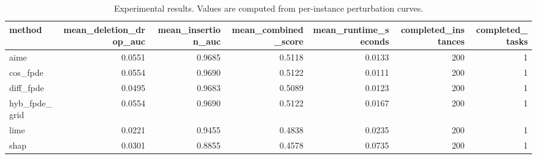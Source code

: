 \begin{table}[t]
\caption{Experimental results. Values are computed from per-instance perturbation curves.}
\label{tab:main_results_computed}
\centering
\begin{tabular}{lrrrrrr}
\toprule
method & mean\_deletion\_drop\_auc & mean\_insertion\_auc & mean\_combined\_score & mean\_runtime\_seconds & completed\_instances & completed\_tasks \\
\midrule
aime & 0.0551 & 0.9685 & 0.5118 & 0.0133 & 200 & 1 \\
cos\_fpde & 0.0554 & 0.9690 & 0.5122 & 0.0111 & 200 & 1 \\
diff\_fpde & 0.0495 & 0.9683 & 0.5089 & 0.0123 & 200 & 1 \\
hyb\_fpde\_grid & 0.0554 & 0.9690 & 0.5122 & 0.0167 & 200 & 1 \\
lime & 0.0221 & 0.9455 & 0.4838 & 0.0235 & 200 & 1 \\
shap & 0.0301 & 0.8855 & 0.4578 & 0.0735 & 200 & 1 \\
\bottomrule
\end{tabular}

\end{table}
